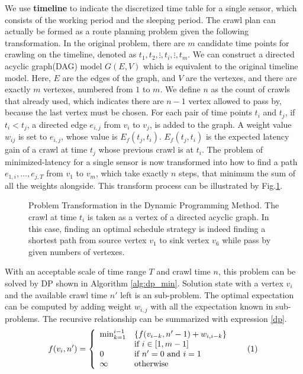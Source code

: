 \documentclass[conference]{IEEEtran}
\newcommand\numberthis{\addtocounter{equation}{1}\tag{\theequation}}
\begin{document}
We use \textbf{timeline} to indicate the discretized time table for a single sensor, which consists of the working period and the sleeping period.
The crawl plan can actually be formed as a route planning problem given the following transformation.
In the original problem, there are $m$ candidate time points for crawling on the timeline, denoted as $t_1, t_2, \vdots, t_i, \vdots, t_m$.
We can construct a directed acyclic graph(DAG) model $G(E,V)$ which is equivalent to the original timeline model.
Here, $E$ are the edges of the graph, and $V$ are the vertexes, and there are exactly $m$ vertexes, numbered from $1$ to $m$. 
We define $n$ as the count of crawls that already used, which indicates there are $n-1$ vertex allowed to pass by, because the last vertex must be chosen. 
For each pair of time points $t_i$ and $t_j$, if $t_i<t_j$, a directed edge $e_{i,j}$ from $v_i$ to $v_j$, is added to the graph. 
A weight value $w_{ij}$ is set to $e_{i,j}$, whose value is $E_f(t_j, t_i)$.
$E_f(t_j, t_i)$ is the expected latency gain of a crawl at time $t_j$ whose previous crawl is at $t_i$.
The problem of minimized-latency for a single sensor is now transformed into how to find a path $e_{1,i},\ldots,e_{j,T}$ from $v_1$ to $v_m$, which take exactly $n$ steps, that minimum the sum of all the weights alongside.
This transform process can be illustrated by Fig.\ref{fig:problemtrans}.
\begin{figure}
	\centering
	
	\captionsetup{justification=centering}
	\captionsetup{justification=justified, singlelinecheck=false}
	\caption{Problem Transformation in the Dynamic Programming Method. The crawl at time $t_i$ is taken as a vertex of a directed acyclic graph. In this case, finding an optimal schedule strategy is indeed finding a shortest path from source vertex $v_1$ to sink vertex $v_6$ while pass by given numbers of vertexes.}
	\vspace{-1.5em}
	\label{fig:problemtrans}
\end{figure}

With an acceptable scale of time range $T$ and crawl time $n$, this problem can be solved by DP shown in Algorithm \ref{alg:dp_min}. 
Solution state with a vertex $v_i$ and the available crawl time $n'$ left is an sub-problem. 
The optimal expectation can be computed by adding weight $w_{i,j}$ with all the expectation known in sub-problems. 
The recursive relationship can be summarized with expression \eqref{dp}.
\[
f(v_i, n')=\left\{
\begin{array}{ll}
\min_{k=1}^{i-1} & \{f(v_{i-k}, n'-1)+w_{i,i-k}\}\\
& \text{if } i\in[1, m-1]\\
0 & \text{if } n'=0 \text{ and } i=1\\
\infty & \text{otherwise}
\end{array}\numberthis \label{dp}
\right.
\]
\end{document}
